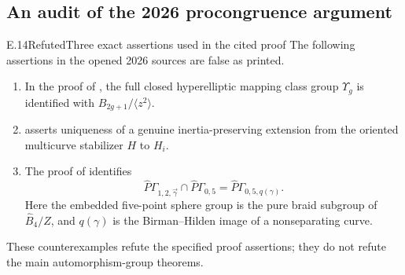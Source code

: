 \subsection{An audit of the 2026 procongruence argument}

\begin{result}{E.14}{Refuted}{Three exact assertions used in the cited proof}
The following assertions in the opened 2026 sources are false
as printed.
\begin{enumerate}
\item In the proof of \cite[Proposition 6.9, p.~36]{ET_Boggi2026},
the full closed hyperelliptic mapping class group $\Upsilon_g$
is identified with $B_{2g+1}/\langle z^2\rangle$.
\item \cite[Lemma 6.16, pp.~42--44]{ET_Boggi2026} asserts
uniqueness of a genuine inertia-preserving extension from the
oriented multicurve stabilizer $H$ to $H_i$.
\item The proof of \cite[Lemma 2.23, p.~22]{ET_BF2026} identifies
\[
 \widehat P\Gamma_{1,2,\vec\gamma}\cap\widehat P\Gamma_{0,5}
          =\widehat P\Gamma_{0,5,q(\gamma)}.                \tag{E.26}
\]
Here the embedded five-point sphere group is the pure braid
subgroup of $\widehat B_4/Z$, and $q(\gamma)$ is the
Birman--Hilden image of a nonseparating curve.
\end{enumerate}
These counterexamples refute the specified proof assertions;
they do not refute the main automorphism-group theorems.
\end{result}
